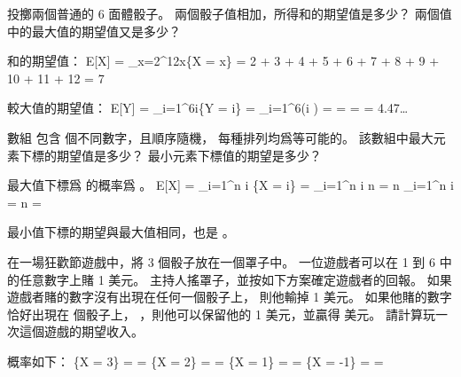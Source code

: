 \startsection[
  title={Discrete random variables},
]

\startEXERCISE
投擲兩個普通的 6 面體骰子。
兩個骰子值相加，所得和的期望值是多少？
兩個值中的最大值的期望值又是多少？
\stopEXERCISE

\startANSWER
和的期望值：
\startformula\startmathalignment
\NC E[X] \NC = \sum_{x=2}^{12}x\Pr\{X = x\} \NR
\NC \NC =  2 \cdot {} +
           3 \cdot {} +
           4 \cdot {} +
           5 \cdot {} +
           6 \cdot {} +
           7 \cdot {} +
           8 \cdot {} +
           9 \cdot {} +
          10 \cdot {} +
          11 \cdot {} +
          12 \cdot {} \NR
\NC \NC = 7 \NR
\stopmathalignment\stopformula

較大值的期望值：
\startformula\startmathalignment
\NC E[Y]
    \NC = \sum_{i=1}^{6}i\Pr\{Y = i\} \NR
\NC \NC = \sum_{i=1}^{6}\left(i \cdot {}\right) \NR
\NC \NC =  \NR
\NC \NC =  \NR
\NC \NC =  = 4.47\ldots \NR
\stopmathalignment\stopformula
\stopANSWER

\startEXERCISE
數組  包含  個不同數字，且順序隨機，
每種排列均爲等可能的。
該數組中最大元素下標的期望值是多少？
最小元素下標值的期望是多少？
\stopEXERCISE

\startANSWER
最大值下標爲  的概率爲 。
\startformula\startmathalignment
\NC E[X]
    \NC = \sum_{i=1}^n i \cdot \Pr\{X = i\} \NR
\NC \NC = \sum_{i=1}^n i \cdot {} n \NR
\NC \NC =  n \sum_{i=1}^n i \NR
\NC \NC =  n  \NR
\NC \NC =  \NR
\stopmathalignment\stopformula

最小值下標的期望與最大值相同，也是 。
\stopANSWER

\startEXERCISE
在一場狂歡節遊戲中，將 3 個骰子放在一個罩子中。
一位遊戲者可以在 1 到 6 中的任意數字上賭 1 美元。
主持人搖罩子，並按如下方案確定遊戲者的回報。
如果遊戲者賭的數字沒有出現在任何一個骰子上，
則他輸掉 1 美元。
如果他賭的數字恰好出現在  個骰子上，
 ，則他可以保留他的 1 美元，並贏得  美元。
請計算玩一次這個遊戲的期望收入。
\stopEXERCISE

\startANSWER
概率如下：
\startformula\startmathalignment
\NC \Pr\{X = 3\} \NC =  \cdot {} \cdot {}
                     =  \NR
\NC \Pr\{X = 2\} \NC = 
                       \cdot {} \cdot {} \cdot {}
		     =  \NR
\NC \Pr\{X = 1\} \NC = 
                       \cdot {} \cdot {} \cdot {}
		     =  \NR
\NC \Pr\{X = -1\} \NC =  \cdot {} \cdot {}
		     =  \NR
\stopmathalignment\stopformula

